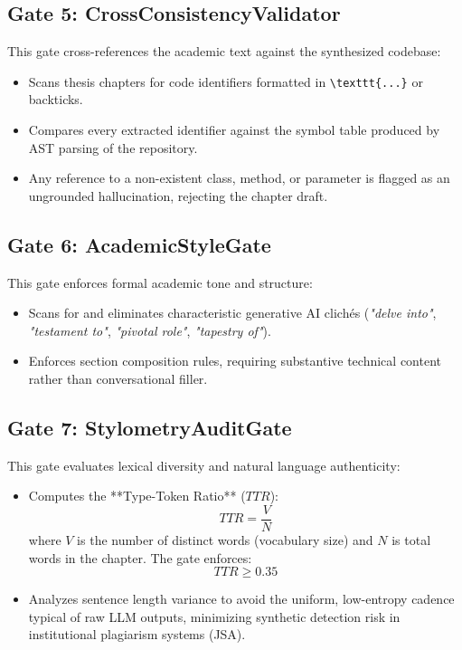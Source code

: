 \subsection{Gate 5: CrossConsistencyValidator}
This gate cross-references the academic text against the synthesized codebase:
\begin{itemize}
    \item Scans thesis chapters for code identifiers formatted in \texttt{\textbackslash texttt\{...\}} or backticks.
    \item Compares every extracted identifier against the symbol table produced by AST parsing of the repository.
    \item Any reference to a non-existent class, method, or parameter is flagged as an ungrounded hallucination, rejecting the chapter draft.
\end{itemize}

\subsection{Gate 6: AcademicStyleGate}
This gate enforces formal academic tone and structure:
\begin{itemize}
    \item Scans for and eliminates characteristic generative AI clichés (\emph{"delve into"}, \emph{"testament to"}, \emph{"pivotal role"}, \emph{"tapestry of"}).
    \item Enforces section composition rules, requiring substantive technical content rather than conversational filler.
\end{itemize}

\subsection{Gate 7: StylometryAuditGate}
This gate evaluates lexical diversity and natural language authenticity:
\begin{itemize}
    \item Computes the **Type-Token Ratio** ($TTR$):
    \begin{equation}
        TTR = \frac{V}{N}
        \label{eq:ttr_en}
    \end{equation}
    where $V$ is the number of distinct words (vocabulary size) and $N$ is total words in the chapter. The gate enforces:
    \begin{equation}
        TTR \ge 0.35
    \end{equation}
    \item Analyzes sentence length variance to avoid the uniform, low-entropy cadence typical of raw LLM outputs, minimizing synthetic detection risk in institutional plagiarism systems (JSA).
\end{itemize}

